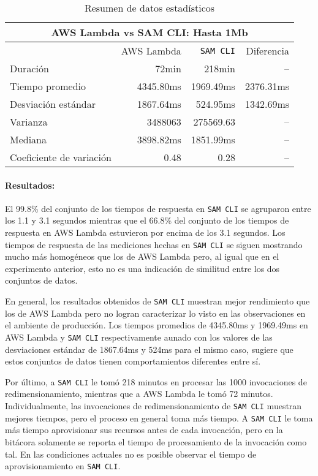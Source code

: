 \begin{table}
    \centering
    \begin{tabular}{l|r|r|r}
        \toprule[1.5pt]
         \multicolumn{4}{c}{\textbf{AWS Lambda vs SAM CLI: Hasta 1Mb}} \\
         \midrule
         & AWS Lambda & \texttt{SAM CLI} & Diferencia \\ 
         \midrule
        Duración & 72min & 218min & -- \\
        Tiempo promedio  & 4345.80ms & 1969.49ms & 2376.31ms\\
        Desviación estándar & 1867.64ms & 524.95ms & 1342.69ms \\
        Varianza & 3488063 & 275569.63 & -- \\
        Mediana & 3898.82ms & 1851.99ms & -- \\
        Coeficiente de variación & 0.48 & 0.28 & -- \\                        
        \bottomrule[1.5pt]
    \end{tabular}
    \caption{Resumen de datos estadísticos}
    \label{table:sam-datos-estadisticos-hasta-1mb}
\end{table}

\paragraph{Resultados:} El 99.8\% del conjunto de los tiempos de respuesta en \texttt{SAM CLI} se agruparon entre los 1.1 y 3.1 segundos mientras que el 66.8\% del conjunto de los tiempos de respuesta en AWS Lambda estuvieron por encima de los 3.1 segundos. Los tiempos de respuesta de las mediciones hechas en \texttt{SAM CLI} se siguen mostrando mucho más homogéneos que los de AWS Lambda pero, al igual que en el experimento anterior, esto no es una indicación de similitud entre los dos conjuntos de datos. 

En general, los resultados obtenidos de \texttt{SAM CLI} muestran mejor rendimiento que los de AWS Lambda pero no logran caracterizar lo visto en las observaciones en el ambiente de producción. Los tiempos promedios de 4345.80ms y 1969.49ms en AWS Lambda y \texttt{SAM CLI} respectivamente aunado con los valores de las desviaciones estándar de 1867.64ms y 524ms para el mismo caso, sugiere que estos conjuntos de datos tienen comportamientos diferentes entre sí.

Por último, a \texttt{SAM CLI} le tomó 218 minutos en procesar las 1000 invocaciones de redimensionamiento, mientras que a AWS Lambda le tomó 72 minutos. Individualmente, las invocaciones de redimensionamiento de \texttt{SAM CLI} muestran mejores tiempos, pero el proceso en general toma más tiempo. A \texttt{SAM CLI} le toma más tiempo aprovisionar sus recursos antes de cada invocación, pero en la bitácora solamente se reporta el tiempo de procesamiento de la invocación como tal. En las condiciones actuales no es posible observar el tiempo de aprovisionamiento en \texttt{SAM CLI}.


